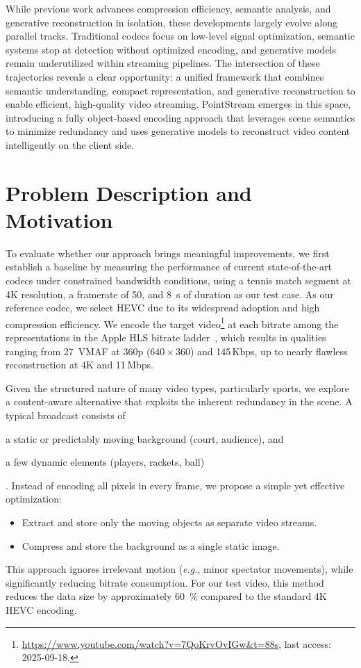 \documentclass[manuscript, screen]{acmart}
\newcommand{\eg}{\emph{e.g.}, }
\newcommand{\vxv}[2]{$#1\!\times\!#2$}
\begin{document}
While previous work advances compression efficiency, semantic analysis, and generative reconstruction in isolation, these developments largely evolve along parallel tracks. Traditional codecs focus on low-level signal optimization, semantic systems stop at detection without optimized encoding, and generative models remain underutilized within streaming pipelines. The intersection of these trajectories reveals a clear opportunity: a unified framework that combines semantic understanding, compact representation, and generative reconstruction to enable efficient, high-quality video streaming. PointStream emerges in this space, introducing a fully object-based encoding approach that leverages scene semantics to minimize redundancy and uses generative models to reconstruct video content intelligently on the client side.


\section{Problem Description and Motivation}
To evaluate whether our approach brings meaningful improvements, we first establish a baseline by measuring the performance of current state-of-the-art codecs under constrained bandwidth conditions, using a tennis match segment at 4K resolution, a framerate of \SI{50}{\fps}, and \SI{8}{\second} of duration as our test case.
As our reference codec, we select HEVC due to its widespread adoption and high compression efficiency. 
We encode the target video\footnote{\url{https://www.youtube.com/watch?v=7QoKrvOvIGw&t=88s}, last access: 2025-09-18.} at each bitrate among the representations in the Apple HLS bitrate ladder~\cite{AppleHLS}, which results in qualities ranging from \SI{27}{VMAF} at 360p (\vxv{640}{360}) and 145\,Kbps, up to nearly flawless reconstruction at 4K and 11\,Mbps. 

Given the structured nature of many video types, particularly sports, we explore a content-aware alternative that exploits the inherent redundancy in the scene. 
A typical broadcast consists of 
\begin{enumerate*}[label=\textit{(\roman*)}] 
\item a static or predictably moving background (court, audience), and 
\item a few dynamic elements (players, rackets, ball)
\end{enumerate*}.
Instead of encoding all pixels in every frame, we propose a simple yet effective optimization:
\begin{itemize}[topsep=0pt,itemsep=0pt,leftmargin=*]
    \item Extract and store only the moving objects as separate video streams.
    \item Compress and store the background as a single static image.
\end{itemize}
This approach ignores irrelevant motion (\eg minor spectator movements), while significantly reducing bitrate consumption. For our test video, this method reduces the data size by approximately \qty{60}{\percent} compared to the standard 4K HEVC encoding.
\end{document}
